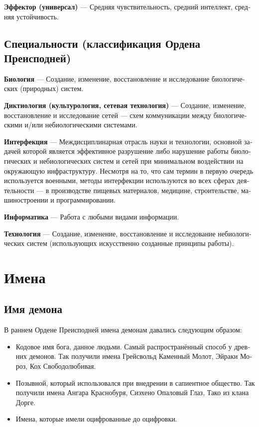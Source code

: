 \documentclass[a4paper,12pt,fleqn]{book}\usepackage{cooltooltips}\usepackage{polyglossia}\setdefaultlanguage[babelshorthands=true]{russian}\setotherlanguage{english}\defaultfontfeatures{Ligatures=TeX,Mapping=tex-text} \usepackage{xcolor}\definecolor{lightgray}{HTML}{bbbbbb}\color{lightgray}\newcommand{\ml}[3]{\textenglish{\textcolor{black}{#3}}}
\newcommand{\theterm}[3]{\textbf{\hypertarget{#1}{#2}} --- #3}
\begin{document}
{\theterm{effector}
{Эффектор (универсал)}
{Средняя чувствительность, средний интеллект, средняя устойчивость.}

\section{Специальности (классификация Ордена Преисподней)}

\theterm{biology}
{Биология}
{Создание, изменение, восстановление и исследование биологических (природных) систем.}

\theterm{dictiology}
{Диктиология (культурология, сетевая технология)}
{Создание, изменение, восстановление и исследование сетей --- схем коммуникации между биологическими и/или небиологическими системами.}

\theterm{interfection}
{Интерфекция}
{Междисциплинарная отрасль науки и технологии, основной задачей которой является эффективное разрушение либо нарушение работы биологических и небиологических систем и сетей при минимальном воздействии на окружающую инфраструктуру.
Несмотря на то, что сам термин в первую очередь используется военными, методы интерфекции используются во всех сферах деятельности --- в производстве пищевых материалов, медицине, строительстве, машиностроении и программировании.}

\theterm{informatics}
{Информатика}
{Работа с любыми видами информации.}

\theterm{technology}
{Технология}
{Создание, изменение, восстановление и исследование небиологических систем (использующих искусственно созданные принципы работы).}

\chapter{Имена}

\section{Имя демона}

В раннем Ордене Преисподней имена демонам давались следующим образом:

\begin{itemize}
\item Кодовое имя бога, данное людьми.
Самый распространённый способ у древних демонов.
Так получили имена Грейсвольд Каменный Молот, Эйраки Мороз, Кох Свободолюбивая.
\item Позывной, который использовался при внедрении в сапиентное общество.
Так получили имена Ангара Краснобуря, Сиэхено Опаловый Глаз, Тако из клана Дорге.
\item Имена, которые имели оцифрованные до оцифровки.
\end{itemize}

}
\end{document}
